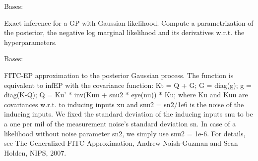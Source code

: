 \documentclass[letterpaper,10pt,english]{sphinxmanual}
\begin{document}

\begin{fulllineitems}
\label{pyGPs.Core:pyGPs.Core.inf.Exact}
Bases: {\hyperref[Likelihoods:pyGPs.Core.inf.Inference]{}}

Exact inference for a GP with Gaussian likelihood. Compute a parametrization
of the posterior, the negative log marginal likelihood and its derivatives
w.r.t. the hyperparameters.

\begin{fulllineitems}
\label{pyGPs.Core:pyGPs.Core.inf.Exact.proceed}
\end{fulllineitems}


\end{fulllineitems}


\begin{fulllineitems}
\label{pyGPs.Core:pyGPs.Core.inf.FITC_EP}
Bases: {\hyperref[Likelihoods:pyGPs.Core.inf.Inference]{}}

FITC-EP approximation to the posterior Gaussian process. The function is
equivalent to infEP with the covariance function:
Kt = Q + G; G = diag(g); g = diag(K-Q);  Q = Ku' * inv(Kuu + snu2 * eye(nu)) * Ku;
where Ku and Kuu are covariances w.r.t. to inducing inputs xu and
snu2 = sn2/1e6 is the noise of the inducing inputs. We fixed the standard
deviation of the inducing inputs snu to be a one per mil of the measurement 
noise's standard deviation sn. In case of a likelihood without noise
parameter sn2, we simply use snu2 = 1e-6.
For details, see The Generalized FITC Approximation, Andrew Naish-Guzman and
Sean Holden, NIPS, 2007.

\begin{fulllineitems}
\label{pyGPs.Core:pyGPs.Core.inf.FITC_EP.proceed}
\end{fulllineitems}


\end{fulllineitems}
\end{document}
